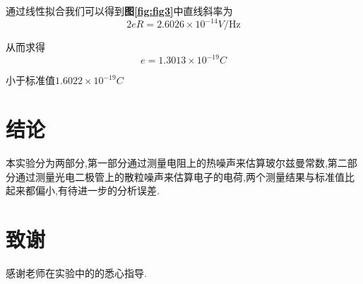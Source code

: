 \documentclass[a4paper]{article}
\begin{document}
通过线性拟合我们可以得到\textbf{图\ref{fig:fig3}}中直线斜率为
\begin{equation}
    2eR=2.6026\times 10^{-14}\si{V/\hertz}
\end{equation}

从而求得
\begin{equation}
    e=1.3013\times10^{-19}\si{C}
\end{equation}

小于标准值\(1.6022×10^{-19}\si{C}\)

\newpage
\section{结论}\label{conclusions}
本实验分为两部分,第一部分通过测量电阻上的热噪声来估算玻尔兹曼常数,第二部分通过测量光电二极管上的散粒噪声来估算电子的电荷,两个测量结果与标准值比起来都偏小,有待进一步的分析误差.

\section{致谢}\label{acknowledgments}
感谢老师在实验中的的悉心指导.
\end{document}
